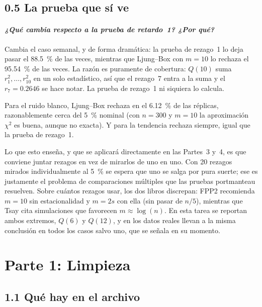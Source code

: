 \documentclass[11pt]{article}
\begin{document}
\subsection{0.5 La prueba que s\'i ve}



\paragraph{{\normalfont\itshape ¿Qu\'e cambia respecto a la prueba de
retardo~1? ¿Por qu\'e?}} Cambia el caso semanal, y de forma dram\'atica: la
prueba de rezago~1 lo deja pasar el \SI{88.5}{\percent} de las veces,
mientras que Ljung--Box con $m=10$ lo rechaza el \SI{95.54}{\percent} de las
veces. La raz\'on es puramente de cobertura: $Q(10)$ suma
$r_1^2,\dots,r_{10}^2$ en un solo estad\'istico, as\'i que el rezago~7 entra
a la suma y el $r_7 = \num{0.2646}$ se hace notar. La prueba de rezago~1 ni
siquiera lo calcula.

Para el ruido blanco, Ljung--Box rechaza en el \SI{6.12}{\percent} de las
r\'eplicas, razonablemente cerca del \SI{5}{\percent} nominal (con $n=300$ y
$m=10$ la aproximaci\'on $\chi^2$ es buena, aunque no exacta). Y para la
tendencia rechaza siempre, igual que la prueba de rezago~1.

Lo que esto ense\~na, y que se aplicar\'a directamente en las Partes~3 y~4,
es que conviene juntar rezagos en vez de mirarlos de uno en uno. Con
\num{20} rezagos mirados individualmente al \SI{5}{\percent} se espera que
uno se salga por pura suerte; ese es justamente el problema de
comparaciones m\'ultiples que las pruebas portmanteau resuelven. Sobre
cu\'antos rezagos usar, los dos libros discrepan: FPP2 recomienda $m=10$ sin
estacionalidad y $m=2s$ con ella (sin pasar de $n/5$), mientras que Tsay cita
simulaciones que favorecen $m \approx \log(n)$. En esta tarea se reportan
ambos extremos, $Q(6)$ y $Q(12)$, y en los datos reales llevan a la misma
conclusi\'on en todos los casos salvo uno, que se se\~nala en su momento.

\section{Parte 1: Limpieza}

\subsection{1.1 Qu\'e hay en el archivo}
\end{document}
